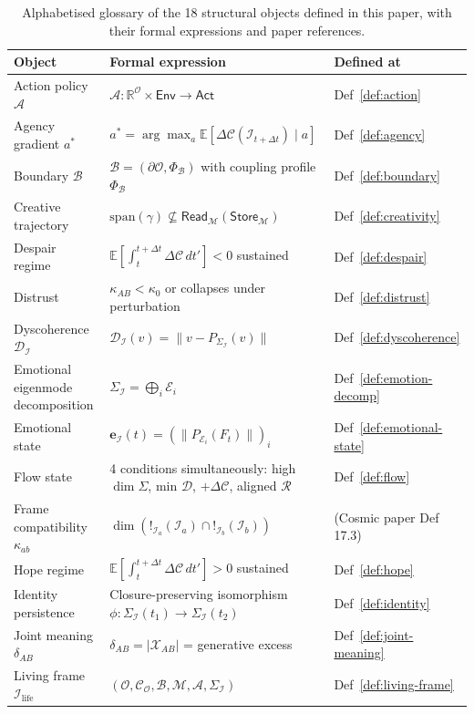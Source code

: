 \documentclass[11pt]{article}
\theoremstyle{plain}
\theoremstyle{definition}
\theoremstyle{remark}
\newcommand{\Ical}{\mathcal{I}}
\newcommand{\Ocal}{\mathcal{O}}
\newcommand{\Ccal}{\mathcal{C}}
\newcommand{\Mcal}{\mathcal{M}}
\newcommand{\Acal}{\mathcal{A}}
\newcommand{\Bcal}{\mathcal{B}}
\newcommand{\Rcal}{\mathcal{R}}
\newcommand{\Dcal}{\mathcal{D}}
\newcommand{\Xcal}{\mathcal{X}}
\newcommand{\Ilife}{\Ical_{\mathrm{life}}}
\begin{document}
\begin{table}[h]
\centering
\small
\caption{Alphabetised glossary of the 18 structural objects defined in this paper, with their formal expressions and paper references.}\label{tab:glossary}
\begin{tabular}{p{2.8cm}p{6.0cm}p{3.0cm}}
\toprule
Object & Formal expression & Defined at \\
\midrule
Action policy $\Acal$ & $\Acal : \mathbb{R}^\Ocal \times \mathsf{Env} \to \mathsf{Act}$ & Def~\ref{def:action} \\
Agency gradient $a^*$ & $a^* = \arg\max_a \mathbb{E}[\Delta\Ccal(\Ical_{t+\Delta t}) \mid a]$ & Def~\ref{def:agency} \\
Boundary $\Bcal$ & $\Bcal = (\partial \Ocal, \Phi_\Bcal)$ with coupling profile $\Phi_\Bcal$ & Def~\ref{def:boundary} \\
Creative trajectory & $\mathrm{span}(\gamma) \not\subseteq \mathsf{Read}_\Mcal(\mathsf{Store}_\Mcal)$ & Def~\ref{def:creativity} \\
Despair regime & $\mathbb{E}[\int_t^{t+\Delta t} \Delta\Ccal \, dt'] < 0$ sustained & Def~\ref{def:despair} \\
Distrust & $\kappa_{AB} < \kappa_0$ or collapses under perturbation & Def~\ref{def:distrust} \\
Dyscoherence $\Dcal_\Ical$ & $\Dcal_\Ical(v) = \|v - P_{\Sigma_\Ical}(v)\|$ & Def~\ref{def:dyscoherence} \\
Emotional eigenmode decomposition & $\Sigma_\Ical = \bigoplus_i \mathcal{E}_i$ & Def~\ref{def:emotion-decomp} \\
Emotional state & $\mathbf{e}_\Ical(t) = (\|P_{\mathcal{E}_i}(F_t)\|)_i$ & Def~\ref{def:emotional-state} \\
Flow state & 4 conditions simultaneously: high $\dim\Sigma$, min $\Dcal$, $+\Delta\Ccal$, aligned $\Rcal$ & Def~\ref{def:flow} \\
Frame compatibility $\kappa_{ab}$ & $\dim(!_{\Ical_a}(\Ical_a) \cap !_{\Ical_b}(\Ical_b))$ & (Cosmic paper Def 17.3) \\
Hope regime & $\mathbb{E}[\int_t^{t+\Delta t} \Delta\Ccal \, dt'] > 0$ sustained & Def~\ref{def:hope} \\
Identity persistence & Closure-preserving isomorphism $\phi : \Sigma_\Ical(t_1) \to \Sigma_\Ical(t_2)$ & Def~\ref{def:identity} \\
Joint meaning $\delta_{AB}$ & $\delta_{AB} = |\Xcal_{AB}|$ = generative excess & Def~\ref{def:joint-meaning} \\
Living frame $\Ilife$ & $(\Ocal, \Ccal_\Ocal, \Bcal, \Mcal, \Acal, \Sigma_\Ical)$ & Def~\ref{def:living-frame} \\

\end{tabular}
\end{table}
\end{document}

